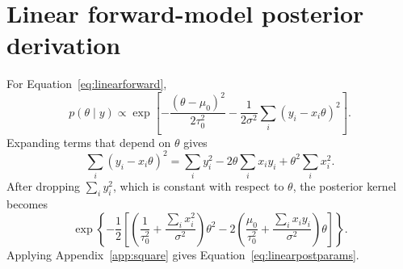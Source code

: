 \documentclass[11pt,a4paper]{article}
\begin{document}
\section{Linear forward-model posterior derivation}
\label{app:linear}
For Equation~\eqref{eq:linearforward},
\begin{equation}
 p(\theta\mid y)\propto
 \exp\left[-\frac{(\theta-\mu_0)^2}{2\tau_0^2}
 -\frac{1}{2\sigma^2}\sum_i(y_i-x_i\theta)^2\right].
\end{equation}
Expanding terms that depend on \(\theta\) gives
\begin{equation}
 \sum_i(y_i-x_i\theta)^2
 =\sum_i y_i^2-2\theta\sum_i x_i y_i+\theta^2\sum_i x_i^2.
\end{equation}
After dropping \(\sum_i y_i^2\), which is constant with respect to \(\theta\), the posterior kernel becomes
\begin{equation}
 \exp\left\{-\frac12\left[
 \left(\frac1{\tau_0^2}+\frac{\sum_i x_i^2}{\sigma^2}\right)\theta^2
 -2\left(\frac{\mu_0}{\tau_0^2}+\frac{\sum_i x_i y_i}{\sigma^2}\right)\theta
 \right]\right\}.
\end{equation}
Applying Appendix~\ref{app:square} gives Equation~\eqref{eq:linearpostparams}.
\end{document}
